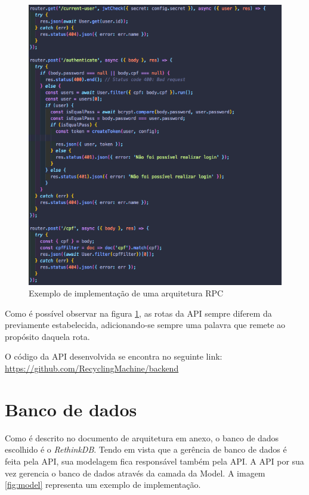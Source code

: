 \begin{figure}[!ht]
	\centering
		\includegraphics[scale=0.6]{figuras/software/rpc.png}
	\caption{Exemplo de implementação de uma arquitetura RPC}
	\label{fig:rpc}
\end{figure}

Como é possível observar na figura \ref{fig:rpc}, as rotas da API sempre diferem da previamente estabelecida, adicionando-se sempre uma palavra que remete ao propósito daquela rota.

O código da API desenvolvida se encontra no seguinte link: \url{https://github.com/RecyclingMachine/backend}

\section{Banco de dados}

Como é descrito no documento de arquitetura em anexo, o banco de dados escolhido é o \textit{RethinkDB}. Tendo em vista que a gerência de banco de dados é feita pela API, sua modelagem fica responsável também pela API. A API por sua vez gerencia o banco de dados através da camada da Model. A imagem \ref{fig:model} representa um exemplo de implementação.

